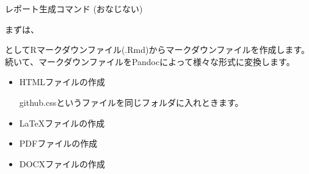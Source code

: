 \begin{frame}[fragile]{レポート生成コマンド (おなじない)}

まずは、

\begin{Shaded}
\begin{Highlighting}[]
\NormalTok{(}\NormalTok{)}
\end{Highlighting}
\end{Shaded}

としてRマークダウンファイル(.Rmd)からマークダウンファイルを作成します。
続いて、マークダウンファイルをPandocによって様々な形式に変換します。

\begin{itemize}
\item
  HTMLファイルの作成

\begin{Shaded}
\begin{Highlighting}[]
\NormalTok{$ } 
\end{Highlighting}
\end{Shaded}

  github.cssというファイルを同じフォルダに入れときます。
\item
  LaTeXファイルの作成

\begin{Shaded}
\begin{Highlighting}[]
\NormalTok{$ } 
\end{Highlighting}
\end{Shaded}
\item
  PDFファイルの作成

\begin{Shaded}
\begin{Highlighting}[]
\NormalTok{$ } 
\end{Highlighting}
\end{Shaded}
\item
  DOCXファイルの作成

\begin{Shaded}
\begin{Highlighting}[]
\NormalTok{$ } 
\end{Highlighting}
\end{Shaded}
\end{itemize}


\end{frame}
